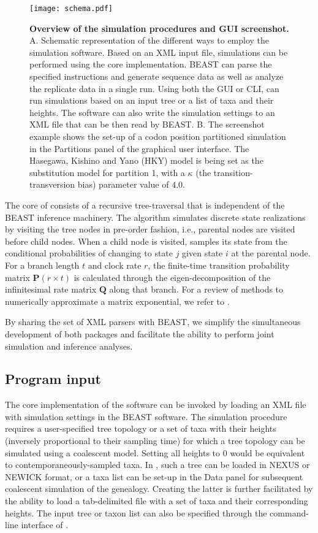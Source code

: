 \begin{figure}[H]
\centering
\texttt{[image: schema.pdf]} 
\caption{
{ \footnotesize 
{\bf Overview of the {\bussname} simulation procedures and GUI screenshot.}
A. Schematic representation of the different ways to employ the {\bussname} simulation software.
Based on an XML input file, simulations can be performed using the core implementation. %
BEAST can parse the specified {\bussname} instructions and generate sequence data as well as analyze the replicate data in a single run.
Using both the GUI or CLI, {\bussname} can run simulations based on an input tree or a list of taxa and their heights.
The software can also write the simulation settings to an XML file that can be then read by BEAST. 
B. The screenshot example shows the set-up of a codon position partitioned simulation in the Partitions panel of the graphical user interface.
The Hasegawa, Kishino and Yano (HKY) model is being set as the substitution model for partition 1, with a $\kappa$ (the transition-transversion bias) parameter value of $4.0$.
}%
}
\label{fig:screenshot}
\end{figure}


The core of {\bussname} consists of a recursive tree-traversal that is independent of the BEAST inference machinery. 
The algorithm simulates discrete state realizations by visiting the tree nodes in pre-order fashion, i.e., parental nodes are visited before child nodes.
When a child node is visited, {\bussname} samples its state from the conditional probabilities of changing to state $j$ given state $i$ at the parental node.
For a branch length $t$ and clock rate $r$, the finite-time transition probability matrix $\mathbf{P}\left(r \times t\right)$ is calculated through the eigen-decomposition of the infinitesimal rate matrix $\mathbf{Q}$ along that branch. 
For a review of methods to numerically approximate a matrix exponential, we refer to \cite{Moler1978}.

By sharing the set of XML parsers with BEAST, we
simplify the simultaneous development of both packages and facilitate the ability to perform joint simulation and inference analyses.

\subsection{Program input} 

The core implementation of the software can be invoked by loading an XML file with simulation settings in the BEAST software.
The simulation procedure requires a user-specified tree topology or a set of taxa with their heights (inversely proportional to their sampling time) for which a tree topology can be simulated using a coalescent model.
Setting all heights to 0 would be equivalent to contemporaneously-sampled taxa.
In {\bussname}, such a tree can be loaded in NEXUS or NEWICK format, or a taxa list can be set-up in the Data panel for subsequent coalescent simulation of the genealogy.
Creating the latter is further facilitated by the ability to load a tab-delimited file with a set of taxa and their corresponding heights.
The input tree or taxon list can also be specified through the command-line interface of {\bussname}.
 
